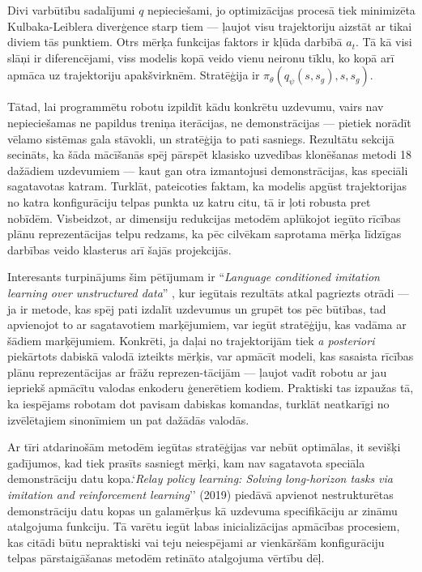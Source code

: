 \documentclass[12pt, a4paper]{article}
\numberwithin{equation}{section} %
\begin{document}
Divi varbūtību sadalījumi $q$ nepieciešami, jo optimizācijas procesā tiek minimizēta Kulbaka-Leiblera diverģence starp tiem --- ļaujot visu trajektoriju aizstāt ar tikai diviem tās punktiem. Otrs mērķa funkcijas faktors ir kļūda darbībā $a_t$. Tā kā visi slāņi ir diferencējami, viss modelis kopā veido vienu neironu tīklu, ko kopā arī apmāca uz trajektoriju apakšvirknēm. Stratēģija ir $\pi_{\theta}(q_{\psi}(s, s_g), s, s_g)$.

Tātad, lai programmētu robotu izpildīt kādu konkrētu uzdevumu, vairs nav nepieciešamas ne papildus treniņa iterācijas, ne demonstrācijas --- pietiek norādīt vēlamo sistēmas gala stāvokli, un stratēģija to pati sasniegs. Rezultātu sekcijā secināts, ka šāda mācīšanās spēj pārspēt klasisko uzvedības klonēšanas metodi 18 dažādiem uzdevumiem --- kaut gan otra izmantojusi demonstrācijas, kas speciāli sagatavotas katram. Turklāt, pateicoties faktam, ka modelis apgūst trajektorijas no katra konfigurāciju telpas punkta uz katru citu, tā ir ļoti robusta pret nobīdēm. Visbeidzot, ar dimensiju redukcijas metodēm aplūkojot iegūto rīcības plānu reprezentācijas telpu redzams, ka pēc cilvēkam saprotama mērķa līdzīgas darbības veido klasterus arī šajās projekcijās.

Interesants turpinājums šim pētījumam ir ``\textit{Language conditioned imitation learning over unstructured data}'' \cite{lynch2021language}, kur iegūtais rezultāts atkal pagriezts otrādi --- ja ir metode, kas spēj pati izdalīt uzdevumus un grupēt tos pēc būtības, tad apvienojot to ar sagatavotiem marķējumiem, var iegūt stratēģiju, kas vadāma ar šādiem marķējumiem. Konkrēti, ja daļai no trajektorijām tiek \textit{a posteriori} piekārtots dabiskā valodā izteikts mērķis, var apmācīt modeli, kas sasaista rīcības plānu reprezentācijas ar frāžu reprezen-tācijām --- ļaujot vadīt robotu ar jau iepriekš apmācītu valodas enkoderu ģenerētiem kodiem. Praktiski tas izpaužas tā, ka iespējams robotam dot pavisam dabiskas komandas, turklāt neatkarīgi no izvēlētajiem sinonīmiem un pat dažādās valodās.

Ar tīri atdarinošām metodēm iegūtas stratēģijas var nebūt optimālas, it sevišķi gadījumos, kad tiek prasīts sasniegt mērķi, kam nav sagatavota speciāla demonstrāciju datu kopa.`\textit{Relay policy learning: Solving long-horizon tasks via imitation and reinforcement learning}'' \cite{gupta2019relay} (2019) piedāvā apvienot nestrukturētas demonstrāciju datu kopas un galamērķus kā uzdevuma specifikāciju ar zināmu atalgojuma funkciju. Tā varētu iegūt labas inicializācijas apmācības procesiem, kas citādi būtu nepraktiski vai teju neiespējami ar vienkāršām konfigurāciju telpas pārstaigāšanas metodēm retināto atalgojuma vērtību dēļ.
\end{document}

